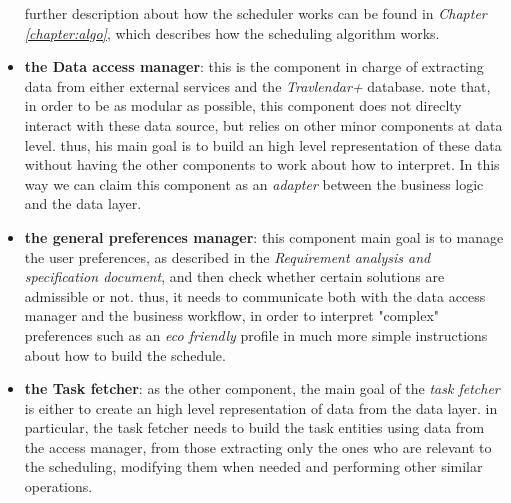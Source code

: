\begin{itemize}
\begin{itemize}
            \end{itemize}
            
    further description about how the scheduler works can be found in \emph{Chapter \ref{chapter:algo}}, which describes how the scheduling algorithm works.
    
    \item \textbf{the Data access manager}: this is the component in charge of extracting data from either external services and the \emph{Travlendar+} database. note that, in order to be as modular as possible, this component does not direclty interact with these data source, but relies on other minor components at data level. thus, his main goal is to build an high level representation of these data without having the other components to work about how to interpret. In this way we can claim this component as an \emph{adapter} between the business logic and the data layer.
    
    \item \textbf{the general preferences manager}: this component main goal is to manage the user preferences, as described in the \emph{Requirement analysis and specification document}, and then check whether certain solutions are admissible or not. thus, it needs to communicate both with the data access manager and the business workflow, in order to interpret "complex" preferences such as an \emph{eco friendly} profile in much more simple instructions about how to build the  
    schedule.
    
    \item \textbf{the Task fetcher}: as the other component, the main goal of the \emph{task fetcher} is either to create an high level representation of data from the data layer. in particular, the task fetcher needs to build the task entities using data from the access manager, from those extracting only the ones who are relevant to the scheduling, modifying them when needed and performing other similar operations.
\end{itemize}

